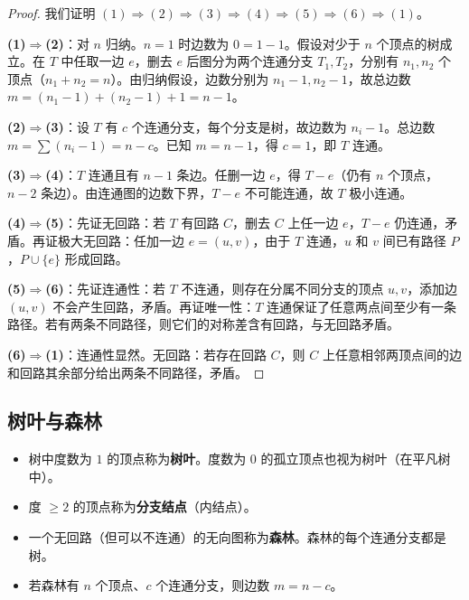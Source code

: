 \begin{proof}
我们证明 $(1)\Rightarrow(2)\Rightarrow(3)\Rightarrow(4)\Rightarrow(5)\Rightarrow(6)\Rightarrow(1)$。

\medskip
\textbf{(1)$\Rightarrow$(2)}：对 $n$ 归纳。$n=1$ 时边数为 $0 = 1-1$。假设对少于 $n$ 个顶点的树成立。在 $T$ 中任取一边 $e$，删去 $e$ 后图分为两个连通分支 $T_1, T_2$，分别有 $n_1, n_2$ 个顶点（$n_1+n_2=n$）。由归纳假设，边数分别为 $n_1-1, n_2-1$，故总边数 $m = (n_1-1)+(n_2-1)+1 = n-1$。

\textbf{(2)$\Rightarrow$(3)}：设 $T$ 有 $c$ 个连通分支，每个分支是树，故边数为 $n_i-1$。总边数 $m = \sum (n_i-1) = n - c$。已知 $m = n-1$，得 $c=1$，即 $T$ 连通。

\textbf{(3)$\Rightarrow$(4)}：$T$ 连通且有 $n-1$ 条边。任删一边 $e$，得 $T-e$（仍有 $n$ 个顶点，$n-2$ 条边）。由连通图的边数下界，$T-e$ 不可能连通，故 $T$ 极小连通。

\textbf{(4)$\Rightarrow$(5)}：先证无回路：若 $T$ 有回路 $C$，删去 $C$ 上任一边 $e$，$T-e$ 仍连通，矛盾。再证极大无回路：任加一边 $e=(u,v)$，由于 $T$ 连通，$u$ 和 $v$ 间已有路径 $P$，$P\cup\{e\}$ 形成回路。

\textbf{(5)$\Rightarrow$(6)}：先证连通性：若 $T$ 不连通，则存在分属不同分支的顶点 $u,v$，添加边 $(u,v)$ 不会产生回路，矛盾。再证唯一性：$T$ 连通保证了任意两点间至少有一条路径。若有两条不同路径，则它们的对称差含有回路，与无回路矛盾。

\textbf{(6)$\Rightarrow$(1)}：连通性显然。无回路：若存在回路 $C$，则 $C$ 上任意相邻两顶点间的边和回路其余部分给出两条不同路径，矛盾。
\end{proof}

\subsection{树叶与森林}

\begin{mydefinition}{}
\begin{itemize}
    \item 树中度数为 $1$ 的顶点称为\textbf{树叶}。度数为 $0$ 的孤立顶点也视为树叶（在平凡树中）。
    \item 度 $\geq 2$ 的顶点称为\textbf{分支结点}（内结点）。
    \item 一个无回路（但可以不连通）的无向图称为\textbf{森林}。森林的每个连通分支都是树。
    \item 若森林有 $n$ 个顶点、$c$ 个连通分支，则边数 $m = n - c$。
\end{itemize}
\end{mydefinition}


